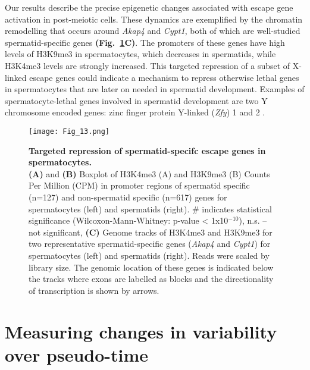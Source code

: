 Our results describe the precise epigenetic changes associated with escape gene activation in post-meiotic cells. These dynamics are exemplified by the chromatin remodelling that occurs around \textit{Akap4} and \textit{Cypt1}, both of which are well-studied spermatid-specific genes \textbf{(Fig.~\ref{fig3:K9_K4_targeted}C)}. The promoters of these genes have high levels of H3K9me3 in spermatocytes, which decreases in spermatids, while H3K4me3 levels are strongly increased. This targeted repression of a subset of X-linked escape genes could indicate a mechanism to repress otherwise lethal genes in spermatocytes that are later on needed in spermatid development. Examples of spermatocyte-lethal genes involved in spermatid development are two Y chromosome encoded genes: zinc finger protein Y-linked (\textit{Zfy}) 1 and 2 \citep{Royo2010}.

\newpage

\begin{figure}[!h]
\centering
\texttt{[image: Fig\_13.png]}
\caption[Targeted repression of spermatid-specifc escape genes in spermatocytes]{\textbf{Targeted repression of spermatid-specifc escape genes in spermatocytes.} \\
\textbf{(A)} and \textbf{(B)} Boxplot of H3K4me3 (A) and H3K9me3 (B) Counts Per Million (CPM) in promoter regions of spermatid specific (n=127) and non-spermatid specific (n=617) genes for spermatocytes (left) and spermatids (right).  \# indicates statistical significance (Wilcoxon-Mann-Whitney: p-value < 1x10$^{-10}$), n.s. – not significant, 
\textbf{(C)} Genome tracks of H3K4me3 and H3K9me3 for two representative spermatid-specific genes (\textit{Akap4} and \textit{Cypt1}) for spermatocytes (left) and spermatids (right). Reads were scaled by library size. The genomic location of these genes is indicated below the tracks where exons are labelled as blocks and the directionality of transcription is shown by arrows.}
\label{fig3:K9_K4_targeted}
\end{figure}

\newpage

\section{Measuring changes in variability over pseudo-time}

